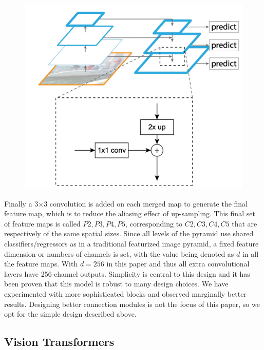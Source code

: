 \begin{figure}[h!]
    \centering
    \includegraphics[scale=0.35]{Figures/fpn-top-down.jpg}
    \caption{}
    \label{fig:fpn-top}
\end{figure}


Finally a 3×3 convolution is added on each merged map to generate the final feature map, which is to reduce the aliasing effect of up-sampling. 
This final set of feature maps is called ${P2, P3, P4, P5}$, corresponding to ${C2, C3, C4, C5}$ that are respectively of the same spatial sizes.
Since all levels of the pyramid use shared classifiers/regressors as in a traditional featurized image pyramid, a fixed feature dimension 
or numbers of channels is set, with the value being denoted as $d$ in all the feature maps. With $d = 256$ in this paper and thus all extra convolutional 
layers have 256-channel outputs. Simplicity is central to this design and it has been proven that this model is robust to many design choices. We have 
experimented with more sophisticated  blocks and observed marginally better results. Designing better connection modules is not the focus of this paper, 
so we opt for the simple design described above.


\subsection{Vision Transformers}









